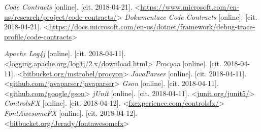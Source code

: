 \begin{thebibliography}{99}
 {\it Code Contracts} [online]. [cit. 2018-04-21]. \textless\url{https://www.microsoft.com/en-us/research/project/code-contracts/}\textgreater
{} {\it Dokumentace Code Contracts} [online]. [cit. 2018-04-21]. \textless\url{https://docs.microsoft.com/en-us/dotnet/framework/debug-trace-profile/code-contracts}\textgreater


 {\it Apache Log4j} [online]. [cit. 2018-04-11]. \textless\url{logging.apache.org/log4j/2.x/download.html}\textgreater
{} {\it Procyon} [online]. [cit. 2018-04-11]. \textless\url{bitbucket.org/mstrobel/procyon}\textgreater
{} {\it JavaParser} [online]. [cit. 2018-04-11]. \textless\url{github.com/javaparser/javaparser}\textgreater
{} {\it Gson} [online]. [cit. 2018-04-11]. \textless\url{github.com/google/gson}\textgreater
{} {\it jUnit} [online]. [cit. 2018-04-11]. \textless\url{junit.org/junit5/}\textgreater
{} {\it ControlsFX} [online]. [cit. 2018-04-12]. \textless\url{fxexperience.com/controlsfx/}\textgreater
{} {\it FontAwesomeFX} [online]. [cit. 2018-04-12]. \textless\url{bitbucket.org/Jerady/fontawesomefx}\textgreater




\end{thebibliography}
